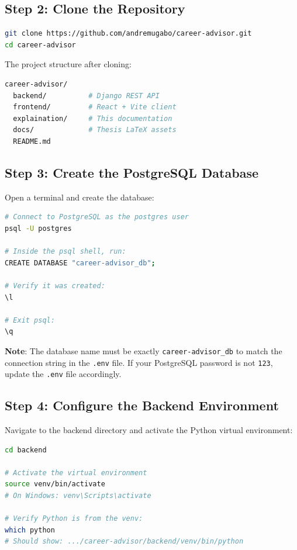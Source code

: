 \documentclass[12pt, a4paper]{article}
\begin{document}
\subsection{Step 2: Clone the Repository}

\begin{lstlisting}[language=bash]
git clone https://github.com/andremugabo/career-advisor.git
cd career-advisor
\end{lstlisting}

The project structure after cloning:
\begin{lstlisting}[language=bash]
career-advisor/
  backend/          # Django REST API
  frontend/         # React + Vite client
  explaination/     # This documentation
  docs/             # Thesis LaTeX assets
  README.md
\end{lstlisting}

\subsection{Step 3: Create the PostgreSQL Database}

Open a terminal and create the database:

\begin{lstlisting}[language=bash]
# Connect to PostgreSQL as the postgres user
psql -U postgres

# Inside the psql shell, run:
CREATE DATABASE "career-advisor_db";

# Verify it was created:
\l

# Exit psql:
\q
\end{lstlisting}

\textbf{Note}: The database name must be exactly \texttt{career-advisor\_db} to match the connection string in the \texttt{.env} file. If your PostgreSQL password is not \texttt{123}, update the \texttt{.env} file accordingly.

\subsection{Step 4: Configure the Backend Environment}

Navigate to the backend directory and activate the Python virtual environment:

\begin{lstlisting}[language=bash]
cd backend

# Activate the virtual environment
source venv/bin/activate
# On Windows: venv\Scripts\activate

# Verify Python is from the venv:
which python
# Should show: .../career-advisor/backend/venv/bin/python
\end{lstlisting}
\end{document}
